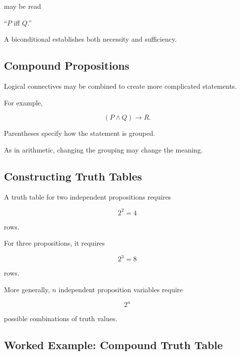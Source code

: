may be read

\begin{center}
``\(P\) iff \(Q\).''
\end{center}

A biconditional establishes both necessity and sufficiency.

\subsection{Compound Propositions}
\label{subsec:compound-propositions}

Logical connectives may be combined to create more complicated statements.

For example,

\[ (P\land Q)\to R. \]

Parentheses specify how the statement is grouped.

As in arithmetic, changing the grouping may change the meaning.

\subsection{Constructing Truth Tables}
\label{subsec:constructing-truth-tables}

A truth table for two independent propositions requires

\[ 2^2=4 \]

rows.

For three propositions, it requires

\[ 2^3=8 \]

rows.

More generally, \(n\) independent proposition variables require

\[ 2^n \]

possible combinations of truth values.

\subsection{Worked Example: Compound Truth Table}
\label{subsec:worked-compound-truth-table}

